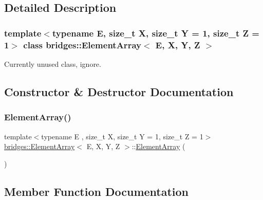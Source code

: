 \subsection{Detailed Description}
\subsubsection*{template$<$typename E, size\+\_\+t X, size\+\_\+t Y = 1, size\+\_\+t Z = 1$>$\newline
class bridges\+::\+Element\+Array$<$ E, X, Y, Z $>$}

Currently unused class, ignore. 

\subsection{Constructor \& Destructor Documentation}
\mbox{\label{classbridges_1_1_element_array_aef0cfb2b7b35cd5b368e4c3987e41768}} 
\subsubsection{\texorpdfstring{Element\+Array()}{ElementArray()}}
{\footnotesize\ttfamily template$<$typename E , size\+\_\+t X, size\+\_\+t Y = 1, size\+\_\+t Z = 1$>$ \\
\mbox{\hyperlink{classbridges_1_1_element_array}{bridges\+::\+Element\+Array}}$<$ E, X, Y, Z $>$\+::\mbox{\hyperlink{classbridges_1_1_element_array}{Element\+Array}} (\begin{DoxyParamCaption}{ }\end{DoxyParamCaption})\hspace{0.3cm}{\ttfamily [inline]}}



\subsection{Member Function Documentation}
\mbox{\label{classbridges_1_1_element_array_adfb4e7d78ce01298ca66447e5c5abe6f}} 
